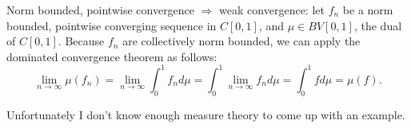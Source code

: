 \documentclass[12pt]{article}
\begin{document}
Norm bounded, pointwise convergence $\Rightarrow$ weak convergence: let $f_n$ be
a norm bounded, pointwise converging sequence in $C[0,1]$, and $\mu \in BV[0,1]$,
the dual of $C[0,1]$. Because $f_n$ are collectively norm bounded, we can apply
the dominated convergence theorem as follows:
\begin{displaymath}
  \lim_{n\to\infty}\mu(f_n) = \lim_{n\to\infty}\int_0^1f_nd\mu =
  \int_0^1\lim_{n\to\infty}f_nd\mu = \int_0^1fd\mu = \mu(f).
\end{displaymath}

Unfortunately I don't know enough measure theory to come up with an example.
\end{document}
